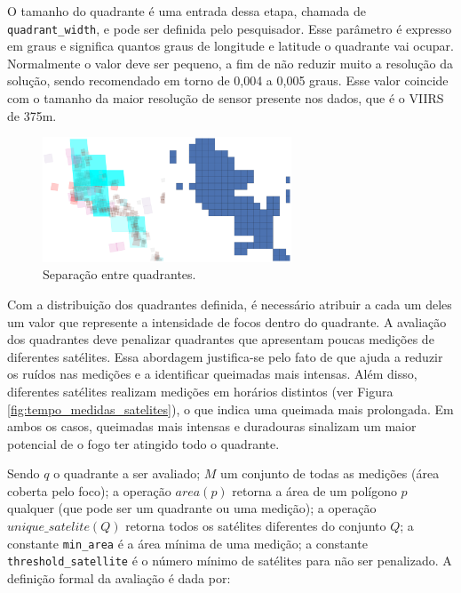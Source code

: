 \documentclass[cic,tc]{iiufrgs}
\begin{document}
O tamanho do quadrante é uma entrada dessa etapa, chamada de \texttt{quadrant\_width}, e pode ser definida pelo pesquisador. Esse parâmetro é expresso em graus e significa quantos graus de longitude e latitude o quadrante vai ocupar. Normalmente o valor deve ser pequeno, a fim de não reduzir muito a resolução da solução, sendo recomendado em torno de 0,004 a 0,005 graus. Esse valor coincide com o tamanho da maior resolução de sensor presente nos dados, que é o VIIRS de 375m.

\begin{figure}[!htb]
    \caption{Separação entre quadrantes.}
    \begin{center}
        \includegraphics[width=20em]{satellite_quads_split}
    \end{center}
    \label{fig:satellite_quads_split}
\end{figure}

Com a distribuição dos quadrantes definida, é necessário atribuir a cada um deles um valor que represente a intensidade de focos dentro do quadrante. A avaliação dos quadrantes deve penalizar quadrantes que apresentam poucas medições de diferentes satélites. Essa abordagem justifica-se pelo fato de que ajuda a reduzir os ruídos nas medições e a identificar queimadas mais intensas. Além disso, diferentes satélites realizam medições em horários distintos (ver Figura \ref{fig:tempo_medidas_satelites}), o que indica uma queimada mais prolongada. Em ambos os casos, queimadas mais intensas e duradouras sinalizam um maior potencial de o fogo ter atingido todo o quadrante.

Sendo $q$ o quadrante a ser avaliado; $M$ um conjunto de todas as medições (área coberta pelo foco); a operação $area(p)$ retorna a área de um polígono $p$ qualquer (que pode ser um quadrante ou uma medição); a operação $unique\_satelite(Q)$ retorna todos os satélites diferentes do conjunto $Q$; a constante \texttt{min\_area} é a área mínima de uma medição; a constante \texttt{threshold\_satellite} é o número mínimo de satélites para não ser penalizado. A definição formal da avaliação é dada por: \par
\end{document}
